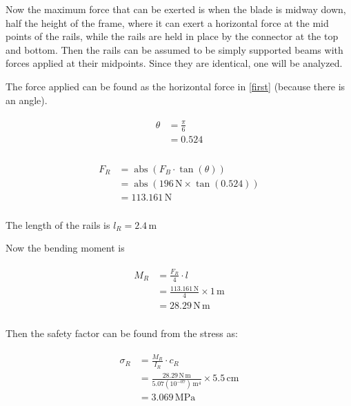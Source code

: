 \documentclass{article}
\begin{document}
Now the maximum force that can be exerted is when the blade is midway down, half the height of the frame, where it can exert a horizontal force at the mid points of the rails, while the rails are held in place by the connector at the top and bottom. Then the rails can be assumed to be simply supported beams with forces applied at their midpoints. Since they are identical, one will be analyzed.

The force applied can be found as the horizontal force in \ref{first} (because there is an angle).

\begin{align}
\begin{split}
\theta	&= \frac{\pi}{6}\\
		&= 0.524\\
\end{split}
\end{align}

\begin{align}
\begin{split}
F_{R}	&= \operatorname{abs}{\left (F_{B} \cdot \tan{\left (\theta \right )} \right )}\\
		&= \operatorname{abs}{\left (196\,\mathrm{N} \times \tan{\left (0.524 \right )} \right )}\\
		&= 113.161\,\mathrm{N}\\
\end{split}
\end{align}

The length of the rails is $l_{R} = 2.4\,\mathrm{m}$

Now the bending moment is

\begin{align}
\begin{split}
M_{R}	&= \frac{F_{R}}{4} \cdot l\\
		&= \frac{113.161\,\mathrm{N}}{4} \times 1\,\mathrm{m}\\
		&= 28.29\,\mathrm{N \, m}\\
\end{split}
\end{align}

Then the safety factor can be found from the stress as:

\begin{align}
\begin{split}
\sigma_{R}	&= \frac{M_{R}}{I_{R}} \cdot c_{R}\\
			&= \frac{28.29\,\mathrm{N \, m}}{5.07(10^{-07})\,\mathrm{m^{4}}} \times 5.5\,\mathrm{cm}\\
			&= 3.069\,\mathrm{MPa}\\
\end{split}
\end{align}
\end{document}
